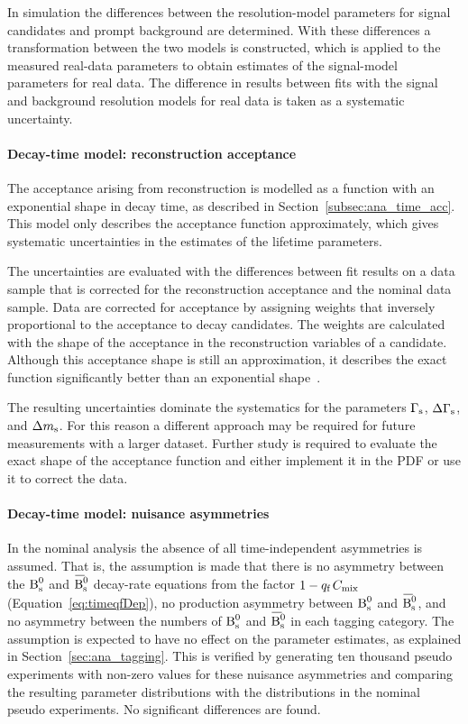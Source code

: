 In simulation the differences between the resolution-model parameters for signal candidates and prompt background are determined. With
these differences a transformation between the two models is constructed, which is applied to the measured real-data parameters to obtain
estimates of the signal-model parameters for real data. The difference in results between fits with the signal and background
resolution models for real data is taken as a systematic uncertainty.

\paragraph{Decay-time model: reconstruction acceptance}
The acceptance arising from reconstruction is modelled as a function with an exponential shape in decay time, as described in
Section~\ref{subsec:ana_time_acc}. This model only describes the acceptance function approximately, which gives systematic uncertainties in
the estimates of the lifetime parameters.

The uncertainties are evaluated with the differences between fit results on a data sample that is corrected for the reconstruction
acceptance and the nominal data sample. Data are corrected for acceptance by assigning weights that inversely proportional to the
acceptance to decay candidates. The weights are calculated with the shape of the acceptance in the reconstruction variables of a
candidate. Although this acceptance shape is still an approximation, it describes the exact function significantly better than an
exponential shape~\cite{LHCb-ANA-2014-039}.

The resulting uncertainties dominate the systematics for the parameters $\Gamma_\text{s}$, $\Delta\Gamma_\text{s}$, and $\Delta m_\text{s}$. For this reason a different approach may
be required for future measurements with a larger dataset. Further study is required to evaluate the exact shape of the acceptance function
and either implement it in the PDF or use it to correct the data.

\paragraph{Decay-time model: nuisance \BsBsbar{} asymmetries}
In the nominal analysis the absence of all time-independent \BsBsbar{} asymmetries is assumed. That is, the assumption is made that there
is no asymmetry between the $\text{B}_\text{s}^\text{0}$ and $\Bsbar$ decay-rate equations from the factor $1-{q_\text{f}}\,C_\text{mix}$ (Equation~\ref{eq:timeqfDep}), no
production asymmetry between $\text{B}_\text{s}^\text{0}$ and $\Bsbar$, and no asymmetry between the numbers of $\text{B}_\text{s}^\text{0}$ and $\Bsbar$ in each tagging category. The
assumption is expected to have no effect on the parameter estimates, as explained in Section~\ref{sec:ana_tagging}. This is verified by
generating ten thousand pseudo experiments with non-zero values for these nuisance asymmetries and comparing the resulting parameter
distributions with the distributions in the nominal pseudo experiments. No significant differences are found.

